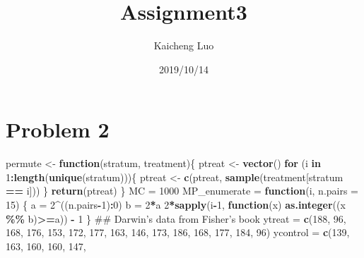 \documentclass[]{article}
\title{Assignment3}
\author{Kaicheng Luo}
\date{2019/10/14}
\newenvironment{Shaded}{\begin{snugshade}}{\end{snugshade}}
\newcommand{\KeywordTok}[1]{\textcolor[rgb]{0.13,0.29,0.53}{\textbf{#1}}}
\newcommand{\DataTypeTok}[1]{\textcolor[rgb]{0.13,0.29,0.53}{#1}}
\newcommand{\DecValTok}[1]{\textcolor[rgb]{0.00,0.00,0.81}{#1}}
\newcommand{\StringTok}[1]{\textcolor[rgb]{0.31,0.60,0.02}{#1}}
\newcommand{\ControlFlowTok}[1]{\textcolor[rgb]{0.13,0.29,0.53}{\textbf{#1}}}
\newcommand{\OperatorTok}[1]{\textcolor[rgb]{0.81,0.36,0.00}{\textbf{#1}}}
\newcommand{\NormalTok}[1]{#1}
\begin{document}
\maketitle

\section*{Problem 2}

\begin{Shaded}
\begin{Highlighting}[]
\NormalTok{permute <-}\StringTok{ }\ControlFlowTok{function}\NormalTok{(stratum, treatment)\{}
\NormalTok{  ptreat <-}\StringTok{ }\KeywordTok{vector}\NormalTok{()}
  \ControlFlowTok{for}\NormalTok{ (i }\ControlFlowTok{in} \DecValTok{1}\OperatorTok{:}\KeywordTok{length}\NormalTok{(}\KeywordTok{unique}\NormalTok{(stratum)))\{}
\NormalTok{    ptreat <-}\StringTok{ }\KeywordTok{c}\NormalTok{(ptreat, }\KeywordTok{sample}\NormalTok{(treatment[stratum }\OperatorTok{==}\StringTok{ }\NormalTok{i]))}
\NormalTok{  \}}
  \KeywordTok{return}\NormalTok{(ptreat)}
\NormalTok{\}}
\NormalTok{MC =}\StringTok{ }\DecValTok{1000}
\NormalTok{MP_enumerate =}\StringTok{ }\ControlFlowTok{function}\NormalTok{(i, }\DataTypeTok{n.pairs =} \DecValTok{15}\NormalTok{) }
\NormalTok{\{}
\NormalTok{ a =}\StringTok{ }\DecValTok{2}\OperatorTok{^}\NormalTok{((n.pairs}\OperatorTok{-}\DecValTok{1}\NormalTok{)}\OperatorTok{:}\DecValTok{0}\NormalTok{)}
\NormalTok{ b =}\StringTok{ }\DecValTok{2}\OperatorTok{*}\NormalTok{a}
 \DecValTok{2}\OperatorTok{*}\KeywordTok{sapply}\NormalTok{(i}\OperatorTok{-}\DecValTok{1}\NormalTok{, }
          \ControlFlowTok{function}\NormalTok{(x) }
            \KeywordTok{as.integer}\NormalTok{((x }\OperatorTok{\%\%}\StringTok{ }\NormalTok{b)}\OperatorTok{>=}\NormalTok{a)) }\OperatorTok{-}\StringTok{ }\DecValTok{1}
\NormalTok{\}}
\NormalTok{## Darwin's data from Fisher's book}
\NormalTok{ytreat     =}\StringTok{ }\KeywordTok{c}\NormalTok{(}\DecValTok{188}\NormalTok{, }\DecValTok{96}\NormalTok{, }\DecValTok{168}\NormalTok{, }\DecValTok{176}\NormalTok{, }\DecValTok{153}\NormalTok{, }
               \DecValTok{172}\NormalTok{, }\DecValTok{177}\NormalTok{, }\DecValTok{163}\NormalTok{, }\DecValTok{146}\NormalTok{, }\DecValTok{173}\NormalTok{, }
               \DecValTok{186}\NormalTok{, }\DecValTok{168}\NormalTok{, }\DecValTok{177}\NormalTok{, }\DecValTok{184}\NormalTok{, }\DecValTok{96}\NormalTok{)}
\NormalTok{ycontrol   =}\StringTok{ }\KeywordTok{c}\NormalTok{(}\DecValTok{139}\NormalTok{, }\DecValTok{163}\NormalTok{, }\DecValTok{160}\NormalTok{, }\DecValTok{160}\NormalTok{, }\DecValTok{147}\NormalTok{, }

\end{Highlighting}
\end{Shaded}
\end{document}
